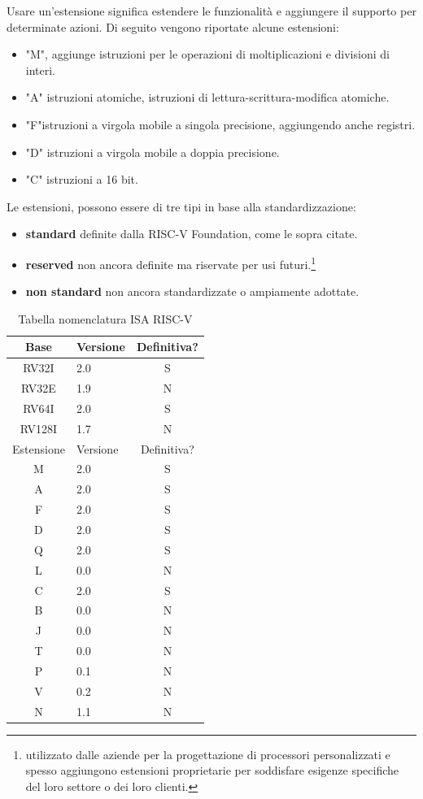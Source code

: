 \documentclass[12pt, a4paper]{report}
\begin{document}
Usare un'estensione significa estendere le funzionalità e aggiungere il supporto per determinate azioni. Di seguito vengono riportate alcune estensioni:
\begin{itemize}
		\item "M", aggiunge istruzioni per le operazioni di moltiplicazioni e divisioni di interi.
		\item "A" istruzioni atomiche, istruzioni di lettura-scrittura-modifica atomiche. %
		\item "F"istruzioni a virgola mobile a singola precisione, aggiungendo anche registri.
		\item "D" istruzioni a virgola mobile a doppia precisione.
		\item "C" istruzioni a 16 bit.
\end{itemize}

Le estensioni, possono essere di tre tipi in base alla standardizzazione:
\begin{itemize}
	\item \textbf{standard} definite dalla RISC-V Foundation, come le sopra citate.
	\item \textbf{reserved} non ancora definite ma riservate per usi futuri.\footnote{utilizzato dalle aziende per la progettazione di processori personalizzati e spesso aggiungono estensioni proprietarie per soddisfare esigenze specifiche del loro settore o dei loro clienti.}
	\item \textbf{non standard} non ancora standardizzate o ampiamente adottate.
\end{itemize}

\begin{table}
\centering
\begin{tabular}{|c|l|c|}
\hline
Base & Versione & Definitiva? \\
\hline
RV32I & 2.0 & S\\
RV32E & 1.9 & N\\
RV64I & 2.0 & S\\
RV128I & 1.7 & N\\
\hline
Estensione & Versione & Definitiva? \\
\hline
M & 2.0 & S\\
A & 2.0 & S\\
F & 2.0 & S\\
D & 2.0 & S\\
Q & 2.0 & S\\
L & 0.0 & N\\
C & 2.0 & S\\
B & 0.0 & N\\
J & 0.0 & N\\
T & 0.0 & N \\
P & 0.1 & N\\
V & 0.2 & N\\
N & 1.1 & N\\
\hline

\end{tabular}
	\caption{Tabella nomenclatura ISA RISC-V}
	\label{tab:nomenclaturaISA}
\end{table}
\end{document}
